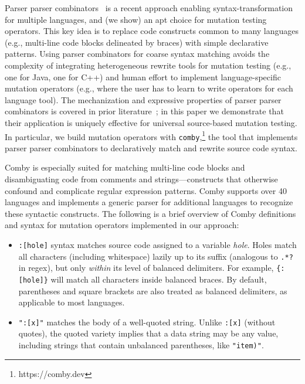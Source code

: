 \documentclass[sigconf,review, anonymous]{acmart}
\begin{document}
{Parser parser combinators~\cite{vanTonderPPC} is a recent approach enabling
syntax-transformation for multiple languages, and (we show) an apt choice for
mutation testing operators. This key idea is to replace code constructs
common to many languages (e.g., multi-line code blocks delineated by braces)
with simple declarative patterns. Using parser combinators for coarse syntax
matching avoids the complexity of integrating heterogeneous rewrite tools for
mutation testing (e.g., one for Java, one for C++) and human effort to
implement language-specific mutation operators (e.g., where the user has to
learn to write operators for each language tool). The mechanization and
expressive properties of parser parser combinators is covered in prior
literature~\cite{vanTonderPPC}; in this paper we demonstrate that their application is
uniquely effective for universal source-based mutation testing. In
particular, we
build mutation operators with \texttt{comby},\footnote{https://comby.dev} the tool that implements parser parser
combinators to declaratively match and rewrite source code syntax. 

Comby is especially suited for matching multi-line code blocks and
disambiguating code from comments and strings---constructs that otherwise
confound and complicate regular expression patterns. Comby supports over 40
languages and implements a generic parser for additional languages to recognize
these syntactic constructs. The following is a brief overview of Comby
definitions and syntax for mutation operators implemented in our approach:

\begin{itemize}

\item \texttt{\small:[hole]} syntax matches source code assigned to a variable \emph{hole}. Holes match all characters (including whitespace) lazily up to its suffix (analogous to \texttt{\small.*?} in regex), but only \emph{within} its level of balanced delimiters. For example, \texttt{\small\{:[hole]\}} will match all characters inside balanced braces. By default, parentheses and square brackets are also treated as balanced delimiters, as applicable to most languages. 

\item \texttt{\small ":[x]"} matches the body of a well-quoted string. Unlike \texttt{\small :[x]} (without quotes), the quoted variety implies that a data string may be any value, including strings that contain unbalanced parentheses, like \texttt{\small "item)"}.


\end{itemize}}
\end{document}
